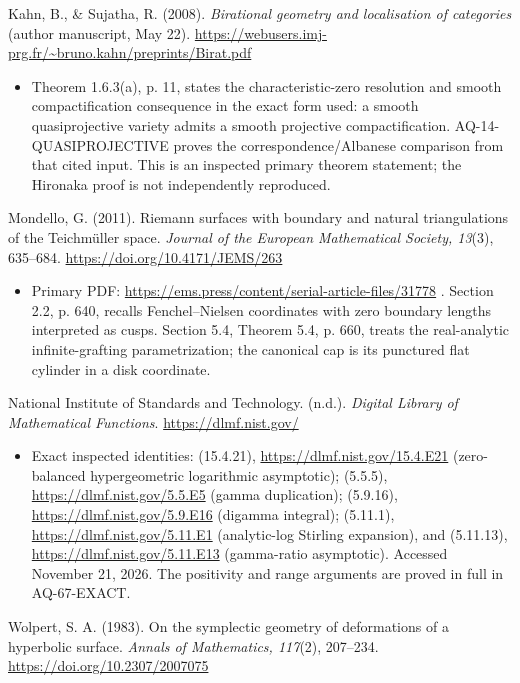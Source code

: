 \documentclass[11pt,a4paper]{article}
\providecommand{\tightlist}{\setlength{\itemsep}{0pt}\setlength{\parskip}{0pt}}
\theoremstyle{definition}\newtheorem{definition}[theorem]{Definition}
\theoremstyle{remark}\newtheorem{remark}[theorem]{Remark}
\begin{document}
Kahn, B., \& Sujatha, R. (2008). \emph{Birational geometry and
localisation of categories} (author manuscript, May 22).
\url{https://webusers.imj-prg.fr/~bruno.kahn/preprints/Birat.pdf}

\begin{itemize}
\tightlist
\item
  Theorem 1.6.3(a), p. 11, states the characteristic-zero resolution and
  smooth compactification consequence in the exact form used: a smooth
  quasiprojective variety admits a smooth projective compactification.
  AQ-14-QUASIPROJECTIVE proves the correspondence/Albanese comparison
  from that cited input. This is an inspected primary theorem statement;
  the Hironaka proof is not independently reproduced.
\end{itemize}

Mondello, G. (2011). Riemann surfaces with boundary and natural
triangulations of the Teichmüller space. \emph{Journal of the European
Mathematical Society, 13}(3), 635--684.
\url{https://doi.org/10.4171/JEMS/263}

\begin{itemize}
\tightlist
\item
  Primary PDF:
  \url{https://ems.press/content/serial-article-files/31778} . Section
  2.2, p. 640, recalls Fenchel--Nielsen coordinates with zero boundary
  lengths interpreted as cusps. Section 5.4, Theorem 5.4, p. 660, treats
  the real-analytic infinite-grafting parametrization; the canonical cap
  is its punctured flat cylinder in a disk coordinate.
\end{itemize}

National Institute of Standards and Technology. (n.d.). \emph{Digital
Library of Mathematical Functions}. \url{https://dlmf.nist.gov/}

\begin{itemize}
\tightlist
\item
  Exact inspected identities: (15.4.21),
  \url{https://dlmf.nist.gov/15.4.E21} (zero-balanced hypergeometric
  logarithmic asymptotic); (5.5.5), \url{https://dlmf.nist.gov/5.5.E5}
  (gamma duplication); (5.9.16), \url{https://dlmf.nist.gov/5.9.E16}
  (digamma integral); (5.11.1), \url{https://dlmf.nist.gov/5.11.E1}
  (analytic-log Stirling expansion), and (5.11.13),
  \url{https://dlmf.nist.gov/5.11.E13} (gamma-ratio asymptotic).
  Accessed November 21, 2026. The positivity and range arguments are
  proved in full in AQ-67-EXACT.
\end{itemize}

Wolpert, S. A. (1983). On the symplectic geometry of deformations of a
hyperbolic surface. \emph{Annals of Mathematics, 117}(2), 207--234.
\url{https://doi.org/10.2307/2007075}
\end{document}

